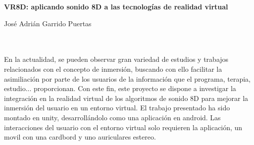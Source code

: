 \begin{center}
{\large\bfseries VR8D: aplicando sonido 8D a las tecnologías de realidad virtual}\\
\end{center}

\begin{center}
José Adrián Garrido Puertas\\
\end{center}

\begin{flushleft}
	\\
	
	\vspace{0.7cm}
	\\
	En la actualidad, se pueden observar gran variedad de estudios y trabajos relacionados con el concepto de inmersión, buscando con ello facilitar la asimiliación por parte de los usuarios de la información que el programa, terapia, estudio... proporcionan.   
	Con este fin, este proyecto se dispone a investigar la integración en la realidad virtual de los algoritmos de sonido 8D para mejorar la inmersión del usuario en un entorno virtual.
	El trabajo presentado ha sido montado en unity, desarrollándolo como una aplicación en android.
	Las interacciones del usuario con el entorno virtual solo requieren la aplicación, un movil con una cardbord y uno auriculares estereo.
\end{flushleft}

\newpage %


